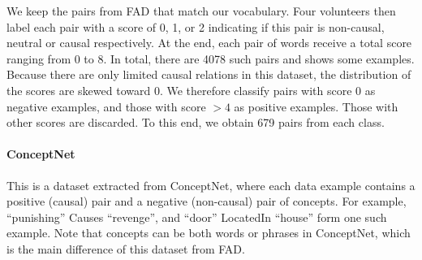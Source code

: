 \begin{table}[th]
	\caption{Sample of human-labeled pairs. Score ranges from 0 to 8. }
	\label{tab:evalset}
\end{table}

We keep the pairs from FAD that match
our vocabulary. Four volunteers then label each pair with a score 
of 0, 1, or 2 indicating if this pair is  non-causal, neutral or
causal respectively. At the end, each pair of words receive a total score
ranging from 0 to 8. In total, there are 4078 such pairs and 
 shows some examples.
Because there are only limited causal relations in this dataset, the 
distribution of the scores are skewed toward 0.
We therefore classify pairs with score 0 as negative examples, and those
with score $> 4$ as positive examples. Those with other scores are
discarded. To this end, we obtain 679 pairs from each class.

\paragraph{ConceptNet} 
This is a dataset extracted from ConceptNet, where
each data example contains a positive (causal) pair and a negative 
(non-causal) pair of concepts.
For example, ``punishing'' Causes ``revenge'', and 
``door'' LocatedIn ``house'' form one such example.
Note that concepts can be both words or phrases in ConceptNet,
which is the main difference of this dataset from FAD.

